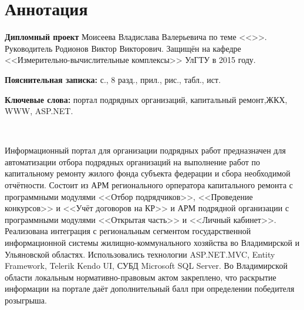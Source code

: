 
\section*{Аннотация}

\textbf{Дипломный проект} Моисеева Владислава Валерьевича по теме <<\WorkName>>. Руководитель Родионов Виктор Викторович. Защищён на кафедре <<Измерительно-вычислительные комплексы>> УлГТУ в 2015 году.

\textbf{Пояснительная записка:}  с., 8 разд.,  прил.,  рис.,  табл.,  ист.

\textbf{Ключевые слова:} портал подрядных организаций, капитальный ремонт,\linebreak ЖКХ, WWW, ASP.NET. 

~

Информационный портал для организации подрядных работ предназначен для автоматизации отбора подрядных организаций на выполнение работ по капитальному ремонту жилого фонда субъекта федерации и сбора необходимой отчётности.
Состоит из АРМ регионального орператора капитального ремонта с программными модулями <<Отбор подрядчиков>>, <<Проведение конкурсов>> и <<Учёт договоров на КР>> и АРМ подрядной организации с программными модулями <<Открытая часть>> и <<Личный кабинет>>.
Реализована интеграция с региональным сегментом государственной информационной системы жилищно-коммунального хозяйства во Владимирской и Ульяновской областях.
Использовались технологии \linebreak ASP.NET.MVC, Entity Framework, Telerik Kendo UI, СУБД Microsoft SQL Server.
Во Владимирской области локальным нормативно-правовым актом закреплено, что раскрытие информации на портале даёт дополнительный балл при определении победителя розыгрыша. 

\clearpage
\newpage